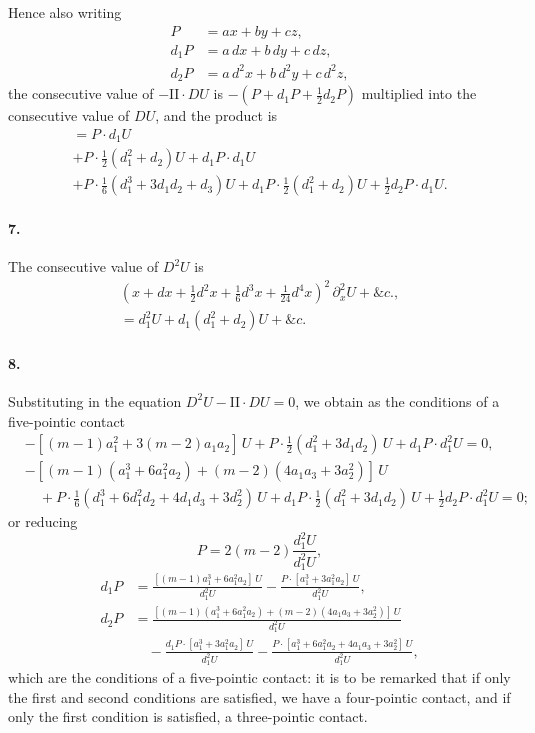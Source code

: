 \documentclass[11pt,a4paper]{book}
\begin{document}
\newpage

Hence  also  writing
\begin{align*}
P &= ax + by + cz, \\
d_1 P &= a\, dx + b\, dy + c\, dz, \\
d_2 P &= a\, d^2x + b\, d^2y + c\, d^2z,
\end{align*}
the   consecutive   value   of  $-\mathrm{II} \cdot DU$  is   $-(P + d_1 P + \tfrac{1}{2}d_2 P)$  multiplied   into   the  consecutive
value  of  $DU$,  and  the  product  is
\begin{multline*}
= P \cdot d_1 U \\
+ P \cdot \tfrac{1}{2}(d_1^2 + d_2) U + d_1 P \cdot d_1 U \\
+ P \cdot \tfrac{1}{6}(d_1^3 + 3d_1 d_2 + d_3) U + d_1 P \cdot \tfrac{1}{2}(d_1^2 + d_2) U + \tfrac{1}{2}d_2 P \cdot d_1 U.
\end{multline*}

\paragraph{7.}
The  consecutive  value  of  $D^2 U$  is
\begin{multline*}
(x + dx + \tfrac{1}{2}d^2x + \tfrac{1}{6}d^3x + \tfrac{1}{24}d^4x)^2 \, \partial_x^2 U + \&c., \\
= d_1^2 U + d_1(d_1^2 + d_2) U + \&c.
\end{multline*}


\paragraph{8.}
Substituting   in  the  equation  $D^2 U - \mathrm{II} \cdot DU = 0$,  we   obtain   as   the   conditions  of
a  five-pointic  contact
\begin{align*}
&-[(m-1)a_1^2 + 3(m-2)a_1 a_2] \, U + P \cdot \tfrac{1}{2}(d_1^2 + 3d_1 d_2) \, U + d_1 P \cdot d_1^2 U = 0, \\
&-[(m-1)(a_1^3 + 6a_1^2 a_2) + (m-2)(4a_1 a_3 + 3a_2^2)] \, U \\
&\quad + P \cdot \tfrac{1}{6}(d_1^3 + 6d_1^2 d_2 + 4d_1 d_3 + 3d_2^2) \, U + d_1 P \cdot \tfrac{1}{2}(d_1^2 + 3d_1 d_2) \, U + \tfrac{1}{2}d_2 P \cdot d_1^2 U = 0;
\end{align*}
or  reducing
\[
P = 2(m-2) \frac{d_1^2 U}{d_1^2 U},
\]
\begin{align*}
d_1 P &= \frac{[(m-1)a_1^3 + 6a_1^2 a_2] \, U}{d_1^2 U} - \frac{P \cdot [a_1^3 + 3a_1^2 a_2] \, U}{d_1^2 U}, \\
d_2 P &= \frac{[(m-1)(a_1^3 + 6a_1^2 a_2) + (m-2)(4a_1 a_3 + 3a_2^2)] \, U}{d_1^2 U} \\
&\quad - \frac{d_1 P \cdot [a_1^3 + 3a_1^2 a_2] \, U}{d_1^2 U} - \frac{P \cdot [a_1^3 + 6a_1^2 a_2 + 4a_1 a_3 + 3a_2^2] \, U}{d_1^2 U},
\end{align*}
which  are  the  conditions  of  a  five-pointic  contact:  it  is  to  be  remarked  that  if  only
the  first  and  second  conditions  are  satisfied,  we  have  a  four-pointic  contact,  and  if  only
the  first  condition  is  satisfied,  a  three-pointic  contact.
\end{document}
